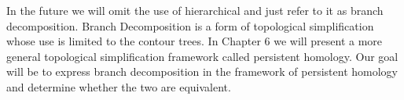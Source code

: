 In the future we will omit the use of hierarchical and just refer to it as branch decomposition. Branch Decomposition is a form of topological simplification whose use is limited to the contour trees. In Chapter 6 we will present a more general topological simplification framework called persistent homology. Our goal will be to express branch decomposition in the framework of persistent homology and determine whether the two are equivalent.


